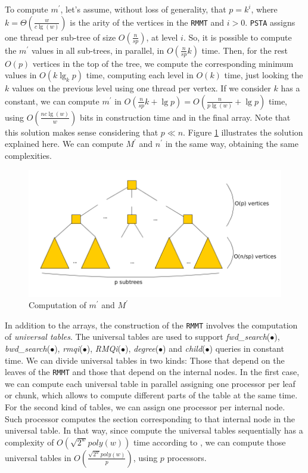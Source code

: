To compute $m^{\prime}$, let's assume, without loss of generality, that $p = k^{i}$, where $k = \Theta(\frac{w}{c\lg(w)})$ is the arity of the vertices in the {\tt RMMT} and $i > 0$. {\tt PSTA} assigns one thread per sub-tree of size $O(\frac{n}{sp})$, at level $i$. So, it is possible to compute the $m^{\prime}$ values in all sub-trees, in parallel, in $O(\frac{n}{sp}k)$ time. Then, for the rest $O(p)$ vertices in the top of the tree, we compute the corresponding minimum values in $O(k\lg_{k} p)$ time, computing each level in $O(k)$ time, just looking the $k$ values on the previous level using one thread per vertex. If we consider $k$ has a constant, we can compute $m^{\prime}$ in $O(\frac{n}{sp}k + \lg p) = O(\frac{n}{p\lg(w)}+\lg p)$ time, using $O(\frac{nc\lg(w)}{w})$ bits in construction time and in the final array. Note that this solution makes sense considering that $p\ll n$. Figure \ref{fig:min-max-array} illustrates the solution explained here. We can compute $M^{\prime}$ and $n^{\prime}$ in the same way, obtaining the same complexities.

	 	\begin{figure}[ht]
			\centering
			\includegraphics[scale=0.28]{./images/Min-Max-array.png}
     		\caption{Computation of $m^{\prime}$ and $M^{\prime}$}
			\label{fig:min-max-array} 
		\end{figure}

	In addition to the arrays, the construction of the {\tt RMMT} involves the computation of \emph{universal tables}. The universal tables are used to support \emph{fwd\_search}($\bullet$), \emph{bwd\_search}($\bullet$), \emph{rmqi}($\bullet$), \emph{RMQi}($\bullet$), \emph{degree}($\bullet$) and \emph{child}($\bullet$) queries in constant time. We can divide universal tables in two kinds: Those that depend on the leaves of the {\tt RMMT} and those that depend on the internal nodes. In the first case, we can compute each universal table in parallel assigning one processor per leaf or chunk, which allows to compute different parts of the table at the same time. For the second kind of tables, we can assign one processor per internal node. Such processor computes the section corresponding to that internal node in the universal table. In that way, since compute the universal tables sequentially has a complexity of $O(\sqrt{2^{w}}poly(w))$ time according to \cite{Navarro:2014:FFS:2620785.2601073}, we can compute those universal tables in $\displaystyle O(\frac{\sqrt{2^{w}}poly(w)}{p})$, using $p$ processors.


